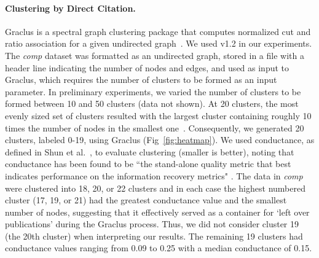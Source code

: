 \paragraph{Clustering by Direct Citation.} Graclus is a spectral graph clustering package that computes normalized cut and ratio association for a given undirected graph~\cite{graclus_2007}.  We used v1.2 in our experiments. The \emph{comp} dataset was formatted as an undirected graph, stored in a file with a header line indicating the number of nodes and edges, and used as input to Graclus, which requires the number of clusters to be formed as an input parameter. In preliminary experiments, we varied the number of clusters to be formed between 10 and 50 clusters (data not shown).  At 20 clusters, the most evenly sized set of clusters resulted with the largest cluster containing roughly 10 times the number of nodes in the smallest one~\cite{traag_louvain_2019}.  Consequently, we generated 20 clusters, labeled 0-19, using Graclus (Fig~\ref{fig:heatmap}).
We used conductance, as defined in Shun et al.~\cite{shun_parallel_2016}, to  evaluate clustering (smaller is better), noting that
conductance has been found to be ``the stand-alone quality metric that best indicates performance on the information recovery metrics" \cite{emmons2016analysis}.
The data in \emph{comp} were clustered into 18, 20, or 22 clusters and in each case the highest numbered cluster (17, 19, or 21) had the greatest conductance value and the smallest number of nodes, suggesting that it effectively served as a container for `left over publications' during the Graclus process. Thus, we did not consider cluster 19 (the 20th cluster) when interpreting our results.  The remaining 19 clusters had conductance values ranging from 0.09 to 0.25 with a median conductance of 0.15.

